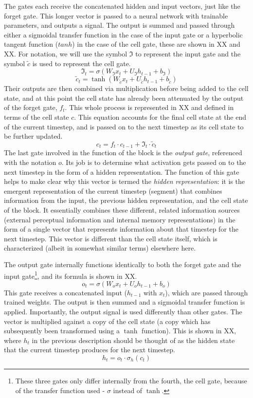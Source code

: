 \documentclass[
  american,
  man,floatsintext]{apa6}
\begin{document}
The gates each receive the concatenated hidden and input vectors, just like the forget gate. This longer vector is passed to a neural network with trainable parameters, and outputs a signal. The output is summed and passed through either a sigmoidal transfer function in the case of the input gate or a hyperbolic tangent function (\(tanh\)) in the case of the cell gate, these are shown in XX and XX. For notation, we will use the symbol \(\Im\) to represent the input gate and the symbol \(\tilde{c}\) is used to represent the cell gate.
\[
\Im_t = \sigma(W_{\Im}x_t + U_{\Im}h_{t-1} + b_{\Im})
\]
\[
\tilde{c}_t = \tanh(W_{\tilde{c}}x_t + U_{\tilde{c}}h_{t-1} + b_{\tilde{c}})
\]
Their outputs are then combined via multiplication before being added to the cell state, and at this point the cell state has already been attenuated by the output of the forget gate, \(f_t\). This whole process is represented in XX and defined in terms of the cell state \(c\). This equation accounts for the final cell state at the end of the current timestep, and is passed on to the next timestep as its cell state to be further updated.
\[
c_t = f_t \cdot c_{t-1} + \Im_t \cdot \tilde{c}_t
\]
The last gate involved in the function of the block is the \emph{output gate}, referenced with the notation \(o\). Its job is to determine what activation gets passed on to the next timestep in the form of a hidden representation. The function of this gate helps to make clear why this vector is termed the \emph{hidden representation}: it is the emergent representation of the current timestep (segment) that combines information from the input, the previous hidden representation, and the cell state of the block. It essentially combines these different, related information sources (external perceptual information and internal memory representations) in the form of a single vector that represents information about that timestep for the next timestep. This vector is different than the cell state itself, which is characterized (albeit in somewhat similar terms) elsewhere here.

The output gate internally functions identically to both the forget gate and the input gate\footnote{These three gates only differ internally from the fourth, the cell gate, because of the transfer function used - \(\sigma\) instead of \(\tanh\).}, and its formula is shown in XX.
\[
o_t = \sigma(W_ox_t + U_oh_{t-1} + b_o)
\]
This gate receives a concatenated input (\(h_{t-1}\) with \(x_t\)), which are passed through trained weights. The output is then summed and a sigmoidal transfer function is applied. Importantly, the output signal is used differently than other gates. The vector is multiplied against a copy of the cell state (a copy which has subsequently been transformed using a \(\tanh\) function). This is shown in XX, where \(h_t\) in the previous description should be thought of as the hidden state that the current timestep produces for the next timestep.
\[
h_t = o_t \cdot \sigma_h(c_t)
\]
\end{document}
